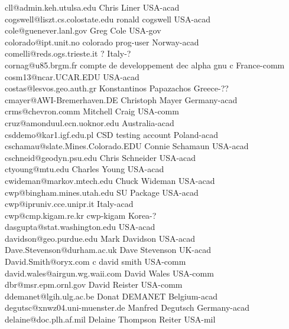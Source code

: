 \begin{tabbing}
cll@admin.keh.utulsa.edu \> Chris Liner \> USA-acad\\
cogswell@liszt.cs.colostate.edu \> ronald cogswell \> USA-acad\\
cole@guenever.lanl.gov \> Greg Cole \> USA-gov\\
colorado@ipt.unit.no \> colorado prog-user \> Norway-acad\\
comelli@reds.ogs.trieste.it \> ? \> Italy-?\\
cornag@u85.brgm.fr \> compte de developpement dec alpha gnu c \>
France-comm\\
cosm13@ncar.UCAR.EDU \> \> USA-acad\\
costas@lesvos.geo.auth.gr \> Konstantinos Papazachos \> Greece-??\\
cmayer@AWI-Bremerhaven.DE \> Christoph Mayer \> Germany-acad\\
crms@chevron.comm \> Mitchell Craig \> USA-comm\\
cruz@amonduul.ecn.uoknor.edu  \> \>   Australia-acad\\
csddemo@kar1.igf.edu.pl \> CSD testing account \> Poland-acad\\
cschamau@slate.Mines.Colorado.EDU \> Connie Schamaun \> USA-acad\\
cschneid@geodyn.psu.edu \> Chris Schneider \> USA-acad\\
ctyoung@mtu.edu \>  Charles Young \>  USA-acad\\
cwideman@markov.mtech.edu \> Chuck Wideman \> USA-acad\\
cwp@bingham.mines.utah.edu \> SU Package \> USA-acad\\
cwp@ipruniv.cce.unipr.it \> \> Italy-acad\\
cwp@cmp.kigam.re.kr \> cwp-kigam \> Korea-?\\
dasgupta@stat.washington.edu \> \> USA-acad\\
davidson@geo.purdue.edu \> Mark Davidson \> USA-acad\\
Dave.Stevenson@durham.ac.uk \> Dave Stevenson \> UK-acad\\
David.Smith@oryx.com \> c david smith \> USA-comm\\
david.wales@airgun.wg.waii.com \> David Wales \> USA-comm\\
dbr@msr.epm.ornl.gov \> David Reister \> USA-comm\\
ddemanet@lgih.ulg.ac.be \> Donat DEMANET \> Belgium-acad\\
degutsc@xnwz04.uni-muenster.de \> Manfred Degutsch \> Germany-acad\\
delaine@doc.plh.af.mil \> Delaine Thompson Reiter \> USA-mil\\

\end{tabbing}
